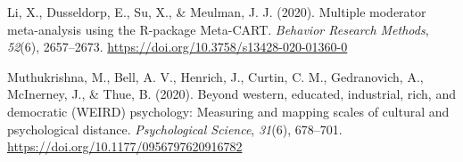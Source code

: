 \documentclass[12pt, letterpaper]{article}
\begin{document}
\leavevmode\hypertarget{ref-li_multiple_2020}{}%
Li, X., Dusseldorp, E., Su, X., \& Meulman, J. J. (2020). Multiple
moderator meta-analysis using the R-package Meta-CART. \emph{Behavior
Research Methods}, \emph{52}(6), 2657--2673.
\url{https://doi.org/10.3758/s13428-020-01360-0}

\leavevmode\hypertarget{ref-muthukrishna_beyond_2020}{}%
Muthukrishna, M., Bell, A. V., Henrich, J., Curtin, C. M., Gedranovich,
A., McInerney, J., \& Thue, B. (2020). Beyond western, educated,
industrial, rich, and democratic (WEIRD) psychology: Measuring and
mapping scales of cultural and psychological distance.
\emph{Psychological Science}, \emph{31}(6), 678--701.
\url{https://doi.org/10.1177/0956797620916782}

\endgroup
\end{document}
